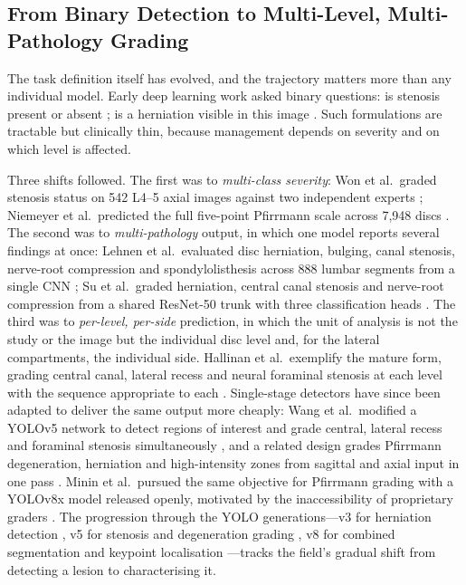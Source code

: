 \subsection{From Binary Detection to Multi-Level, Multi-Pathology Grading}
\label{sec:lr-task-evolution}

The task definition itself has evolved, and the trajectory matters more than any
individual model. Early deep learning work asked binary questions: is stenosis
present or absent \cite{altun2023lssvgg16}; is a herniation visible in this image
\cite{tsai2021lumbar}. Such formulations are tractable but clinically thin,
because management depends on severity and on which level is affected.

Three shifts followed. The first was to \emph{multi-class severity}: Won et al.\
graded stenosis status on 542 L4--5 axial images against two independent experts
\cite{won2020spinal}; Niemeyer et al.\ predicted the full five-point Pfirrmann
scale across 7{,}948 discs \cite{niemeyer2021a}. The second was to
\emph{multi-pathology} output, in which one model reports several findings at
once: Lehnen et al.\ evaluated disc herniation, bulging, canal stenosis,
nerve-root compression and spondylolisthesis across 888 lumbar segments from a
single CNN \cite{lehnen2021detection}; Su et al.\ graded herniation, central
canal stenosis and nerve-root compression from a shared ResNet-50 trunk with
three classification heads \cite{su2022automatic}. The third was to
\emph{per-level, per-side} prediction, in which the unit of analysis is not the
study or the image but the individual disc level and, for the lateral
compartments, the individual side. Hallinan et al.\ exemplify the mature form,
grading central canal, lateral recess and neural foraminal stenosis at each
level with the sequence appropriate to each \cite{hallinan2021deep}. Single-stage
detectors have since been adapted to deliver the same output more cheaply: Wang
et al.\ modified a YOLOv5 network to detect regions of interest and grade
central, lateral recess and foraminal stenosis simultaneously
\cite{wang2025a}, and a related design grades Pfirrmann degeneration, herniation
and high-intensity zones from sagittal and axial input in one pass
\cite{wang2025automated}. Minin et al.\ pursued the same objective for Pfirrmann
grading with a YOLOv8x model released openly, motivated by the inaccessibility
of proprietary graders \cite{minin2025spinescan}. The progression through the
YOLO generations---v3 for herniation detection \cite{tsai2021lumbar}, v5 for
stenosis and degeneration grading
\cite{wang2025a,wang2025automated,liawrungrueang2023automatic}, v8 for combined
segmentation and keypoint localisation
\cite{yilihamu2025quantification,minin2025spinescan}---tracks the field's
gradual shift from detecting a lesion to characterising it.

